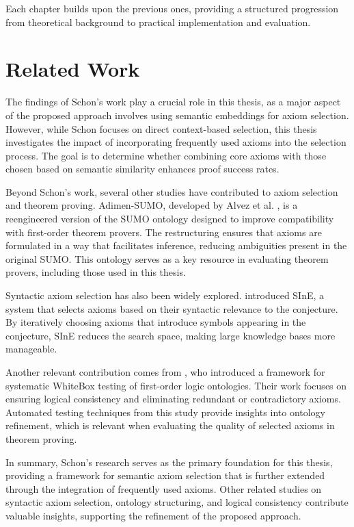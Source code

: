 \documentclass[english,version-2020-11]{uzl-thesis}
\begin{document}
Each chapter builds upon the previous ones, providing a structured progression from theoretical background to practical implementation and evaluation.


\chapter{Related Work}
\label{chapter-relatedwork}
The findings of Schon's work play a crucial role in this thesis, as a major aspect of the proposed approach involves using semantic embeddings for axiom selection.
However, while Schon focuses on direct context-based selection, this thesis investigates the impact of incorporating frequently used axioms into the selection process. The goal is to determine whether combining core axioms with those chosen based on semantic similarity enhances proof success rates.

Beyond Schon's work, several other studies have contributed to axiom selection and theorem proving. Adimen-SUMO, developed by Alvez et al. \cite{Alvez2014}, is a reengineered version of the SUMO ontology designed to improve compatibility with first-order theorem provers. The restructuring ensures that axioms are formulated in a way that facilitates inference, reducing ambiguities present in the original SUMO. This ontology serves as a key resource in evaluating theorem provers, including those used in this thesis.

Syntactic axiom selection has also been widely explored. \cite{Hoder2011} introduced SInE, a system that selects axioms based on their syntactic relevance to the conjecture. By iteratively choosing axioms that introduce symbols appearing in the conjecture, SInE reduces the search space, making large knowledge bases more manageable.

Another relevant contribution comes from \cite{Alvez2017}, who introduced a framework for systematic WhiteBox testing of first-order logic ontologies. Their work focuses on ensuring logical consistency and eliminating redundant or contradictory axioms. Automated testing techniques from this study provide insights into ontology refinement, which is relevant when evaluating the quality of selected axioms in theorem proving.

In summary, Schon's research serves as the primary foundation for this thesis, providing a framework for semantic axiom selection that is further extended through the integration of frequently used axioms. Other related studies on syntactic axiom selection, ontology structuring, and logical consistency contribute valuable insights, supporting the refinement of the proposed approach.
\end{document}

